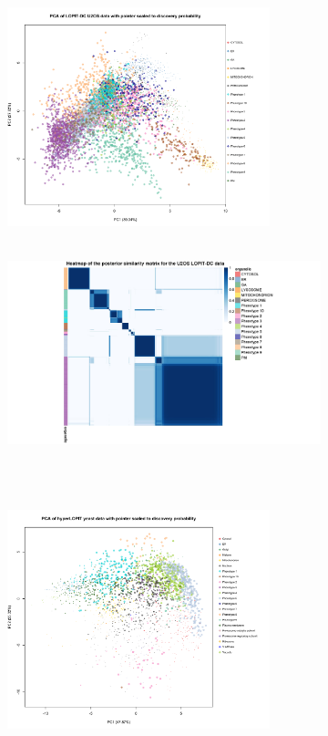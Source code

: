 \documentclass[12pt,english]{article}
\begin{document}
\begin{figure}
	\begin{subfigure}[t]{0.5\textwidth}
	\centering
	\includegraphics[height=2.5in]{pcau2osdc.pdf}
	\caption{}
\end{subfigure}
\begin{subfigure}[t]{0.5\textwidth}
	\centering
	\includegraphics[height=2.5in]{heatmapU2osdc.jpg}
	\caption{}
\end{subfigure}
~
\begin{subfigure}[t]{0.5\textwidth}
	\centering
	\includegraphics[height=2.5in]{pcaYeast.pdf}
	\caption{}
\end{subfigure}
\begin{subfigure}[t]{0.5\textwidth}

\end{subfigure}
\end{figure}
\end{document}
